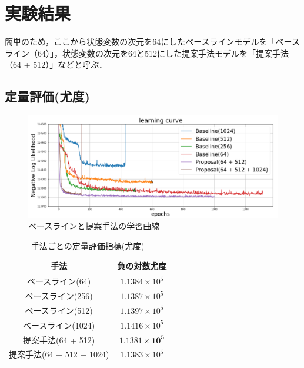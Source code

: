 \documentclass[10pt, twocolumn]{jarticle}
\begin{document}
\section{実験結果}

簡単のため，ここから状態変数の次元を64にしたベースラインモデルを「ベースライン（64）」，状態変数の次元を64と512にした提案手法モデルを「提案手法（64 + 512）」などと呼ぶ．

\subsection{定量評価(尤度)}

\begin{figure}[tp]
    \begin{center}
        \includegraphics[width=\linewidth]{./figures/curve_yoko.png}
        \caption[提案手法の学習曲線]{ベースラインと提案手法の学習曲線}
        \label{fig:curve}
    \end{center}
    \end{figure}

\begin{table}[tbp]
    \begin{center}
    \caption{手法ごとの定量評価指標(尤度)}
    \begin{tabular}{|c||c|} \hline
      手法 & 負の対数尤度 \\ \hline \hline
      ベースライン(64) & $1.1384 \times 10^5 $ \\ \hline
      ベースライン(256) & $1.1387 \times 10^5 $ \\ \hline
      ベースライン(512) & $1.1397 \times 10^5 $ \\ \hline
      ベースライン(1024) & $1.1416 \times 10^5 $ \\ \hline
      提案手法(64 + 512) & $\bm{1.1381 \times 10^5 }$ \\ \hline
      提案手法(64 + 512 + 1024) & $1.1383 \times 10^5$ \\ \hline
    \end{tabular}
    \label{table:evaluation}
    \end{center}
  \end{table}
  
\end{document}
